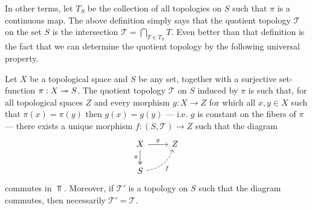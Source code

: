 In other terms, let \(T_S\) be the collection of all topologies on \(S\) such
that \(\pi\) is a continuous map. The above definition simply says that the
quotient topology \(\mathcal T\) on the set \(S\) is the intersection \(\mathcal
T = \bigcap_{T \in T_S}T\). Even better than that definition is the fact that we
can determine the quotient topology by the following universal property.

\begin{theorem}
\label{thm:universal-property-quotient-topology}
Let \(X\) be a topological space and \(S\) be any set, together with a
surjective set-function \(\pi: X \twoheadrightarrow S\). The quotient topology \(\mathcal T\)
on \(S\) induced by \(\pi\) is such that, for all topological spaces \(Z\) and
every morphism \(g: X \to Z\) for which all \(x, y \in X\) such that \(\pi(x) =
\pi(y)\) then \(g(x) = g(y)\) --- i.e. \(g\) is constant on the fibers of
\(\pi\) --- there exists a unique morphism \(f: (S, \mathcal T) \to Z\) such
that the diagram
\[
  \begin{tikzcd}
    X \ar[r, "g"] \ar[d, two heads, swap, "\pi"] &Z\\
    S \ar[ur, swap, bend right, dashed, "f"]
  \end{tikzcd}
\]
commutes in \(\Top\). Moreover, if \(\mathcal T'\) is a topology on \(S\) such
that the diagram commutes, then necessarily \(\mathcal T' = \mathcal T\).
\end{theorem}


